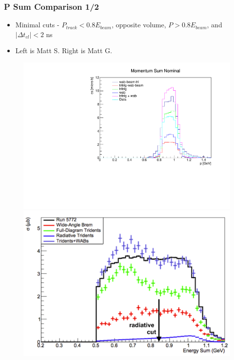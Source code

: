 \documentclass{beamer}
\begin{document}

\begin{frame}
\frametitle{P Sum Comparison 1/2}
\begin{itemize}
\item Minimal cuts - $P_{track}<0.8 E_{beam}$, opposite volume, $P>0.8 E_{beam}$, and $|\Delta t_{cl}| < 2$ ns
\item Left is Matt S. Right is Matt G.
\end{itemize}
\begin{figure}
\includegraphics[width=0.55\linewidth]{figs/psum_minimal.pdf}
\includegraphics[width=0.55\linewidth]{figs/psum_minimal_mattg.png}
\end{figure}

\end{frame}

\end{document}
